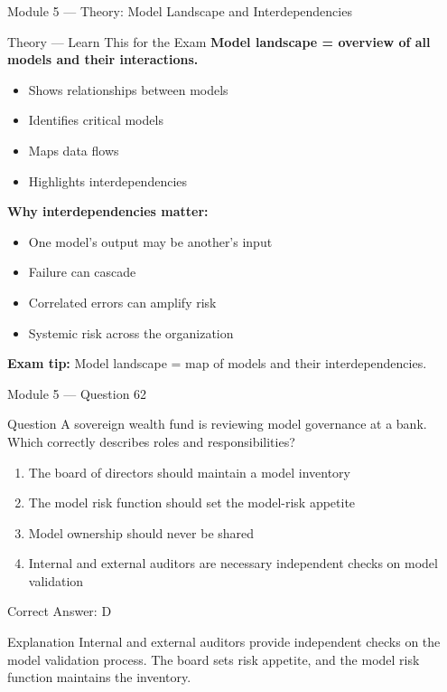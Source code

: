 \documentclass[aspectratio=169,10pt]{beamer}
\newcommand{\question}[1]{%
	\begin{block}{Question}
		#1
	\end{block}
}
\newcommand{\options}[4]{%
	\begin{enumerate}[label=\Alph*.,leftmargin=*]
		\item #1
		\item #2
		\item #3
		\item #4
	\end{enumerate}
}
\newcommand{\answerbox}[1]{%
	\begin{exampleblock}{Correct Answer: #1}
	\end{exampleblock}
}
\newcommand{\explain}[1]{%
	\begin{block}{Explanation}
		\small #1
	\end{block}
}
\newcommand{\theory}[1]{%
	\begin{block}{Theory --- Learn This for the Exam}
		\small #1
	\end{block}
}
\begin{document}
	\begin{frame}{Module 5 --- Theory: Model Landscape and Interdependencies}
		\theory{
			\textbf{Model landscape = overview of all models and their interactions.}
			\begin{itemize}
				\item Shows relationships between models
				\item Identifies critical models
				\item Maps data flows
				\item Highlights interdependencies
			\end{itemize}
			\textbf{Why interdependencies matter:}
			\begin{itemize}
				\item One model's output may be another's input
				\item Failure can cascade
				\item Correlated errors can amplify risk
				\item Systemic risk across the organization
			\end{itemize}
			\textbf{Exam tip:} Model landscape = map of models and their interdependencies.
		}
	\end{frame}
	
	\begin{frame}{Module 5 --- Question 62}
		\question{A sovereign wealth fund is reviewing model governance at a bank. Which correctly describes roles and responsibilities?}
		\options{The board of directors should maintain a model inventory}{The model risk function should set the model-risk appetite}{Model ownership should never be shared}{Internal and external auditors are necessary independent checks on model validation}
		\answerbox{D}
		\explain{Internal and external auditors provide independent checks on the model validation process. The board sets risk appetite, and the model risk function maintains the inventory.}
	\end{frame}
	
\end{document}
